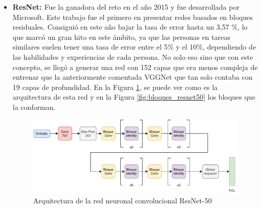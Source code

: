 \begin{itemize}
    
    \item \textbf{ResNet: \cite{He2016}} Fue la ganadora del reto en el año 2015 y fue desarrollada por Microsoft. Este trabajo fue el primero en presentar redes basados en bloques residuales. Consiguió en este año bajar la tasa de error hasta un 3,57 \%, lo que marcó un gran hito en este ámbito, ya que las personas en tareas similares suelen tener una tasa de error entre el 5\% y el 10\%, dependiendo de las habilidades y experiencias de cada persona. No solo eso sino que con este concepto, se llegó a generar una red con 152 capas que era menos compleja de entrenar que la anteriormente comentada VGGNet que tan solo contaba con 19 capas de profundidad. En la Figura \ref{fig:resnet}, se puede ver como es la arquitectura de esta red y en la Figura \ref{fig:bloques_resnet50} los bloques que la conforman.
    
    \begin{figure}[!h]
        \centering
        \includegraphics[width=\textwidth]{figuras/desarrollo teorico/desarrollo_teorico-ResNet 50.pdf}
        \caption{Arquitectura de la red neuronal convolucional ResNet-50}
        \label{fig:resnet}
    \end{figure}
    

\end{itemize}
